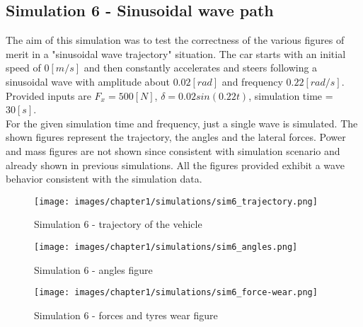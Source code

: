\documentclass{report}
\let\Oldsubsection\subsection
\renewcommand{\subsection}{\FloatBarrier\Oldsubsection}
\begin{document}
\subsection{Simulation 6 - Sinusoidal wave path}
The aim of this simulation was to test the correctness of the various figures of merit in a "sinusoidal wave trajectory" situation. The car starts with an initial speed of $0[m/s]$ and then constantly accelerates and steers following a sinusoidal wave with amplitude about $0.02[rad]$ and frequency $0.22[rad/s]$. Provided inputs are $F_x = 500 [N]$, $\delta = 0.02sin(0.22t)$, simulation time = $30 [s]$. \\For the given simulation time and frequency, just a single wave is simulated. The shown figures represent the trajectory, the angles and the lateral forces. Power and mass figures are not shown since consistent with simulation scenario and already shown in previous simulations. All the figures provided exhibit a wave behavior consistent with the simulation data.  
\begin{figure}[h!]
    \centering
    \texttt{[image: images/chapter1/simulations/sim6\_trajectory.png]}
    \caption{Simulation 6 - trajectory of the vehicle}
    \label{fig:sim6_1}
\end{figure}
\begin{figure}[h!]
    \centering
    \texttt{[image: images/chapter1/simulations/sim6\_angles.png]}
    \caption{Simulation 6 - angles figure}
    \label{fig:sim6_2}
\end{figure}
\begin{figure}[h!]
    \centering
    \texttt{[image: images/chapter1/simulations/sim6\_force-wear.png]}
    \caption{Simulation 6 - forces and tyres wear figure}
    \label{fig:sim6_3}
\end{figure}
\end{document}
